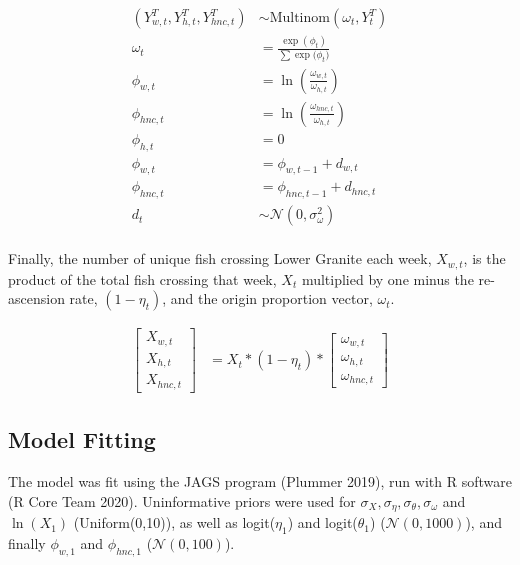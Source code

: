 \documentclass[
  12pt,
]{article}
\begin{document}
\[
\begin{aligned}
  \left( Y^T_{w,t}, Y^T_{h,t}, Y^T_{hnc,t} \right) &\sim \text{Multinom} \left( \omega_t, Y^T_t \right) \\
  \omega_t &= \frac{\exp(\phi_t)}{\sum{\exp(\phi_t})} \\
  \phi_{w,t} &= \ln \left( \frac{\omega_{w,t}}{\omega_{h,t}} \right) \\
  \phi_{hnc,t} &= \ln \left( \frac{\omega_{hnc,t}}{\omega_{h,t}} \right) \\
  \phi_{h,t} &= 0 \\
  \phi_{w,t} &= \phi_{w, t-1} + d_{w,t} \\
  \phi_{hnc,t} &= \phi_{hnc, t-1} + d_{hnc,t} \\
  d_t &\sim \mathcal{N}(0, \sigma^2_\omega) \\
\end{aligned}
\]

Finally, the number of unique fish crossing Lower Granite each week, \(X_{w,t}\), is the product of the total fish crossing that week, \(X_t\) multiplied by one minus the re-ascension rate, \((1 - \eta_t)\), and the origin proportion vector, \(\omega_t\).

\[
\begin{aligned}
  \begin{bmatrix} X_{w,t} \\ X_{h,t} \\ X_{hnc,t} \end{bmatrix}
  &= X_t * (1 - \eta_t) * \begin{bmatrix} \omega_{w,t} \\ \omega_{h,t} \\ \omega_{hnc,t} \end{bmatrix}
\end{aligned}
\]

\hypertarget{model-fitting}{%
\subsection{Model Fitting}\label{model-fitting}}

The model was fit using the JAGS program (Plummer 2019), run with R software (R Core Team 2020). Uninformative priors were used for \(\sigma_X, \sigma_\eta, \sigma_\theta, \sigma_\omega\) and \(\ln(X_1)\) (Uniform(0,10)), as well as logit(\(\eta_1\)) and logit(\(\theta_1\)) (\(\mathcal{N}(0, 1000)\)), and finally \(\phi_{w,1}\) and \(\phi_{hnc,1}\) (\(\mathcal{N}(0, 100)\)).

\newpage
\end{document}
